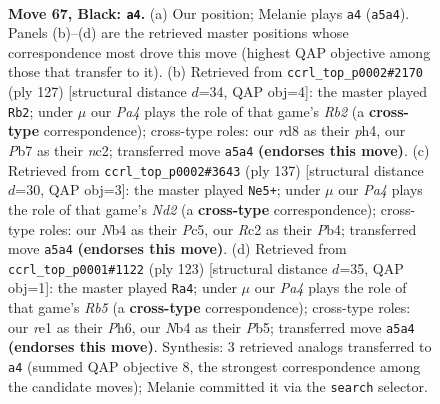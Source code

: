 \documentclass[11pt]{article}
\begin{document}
\clearpage

\begin{figure}[p]\centering
\begin{subfigure}{0.46\textwidth}\centering
\resizebox{\linewidth}{!}{%
\newchessgame
\chessboard[
  setfen={3R4/1p5p/1k4pP/p4p2/1n3P2/7K/2r5/4R3 b - - 22 67},
  showmover=false,
  pgfstyle=straightmove, color=movearrow, markmove={a5-a4}
]}
\caption{}
\end{subfigure}\hfill
\begin{subfigure}{0.46\textwidth}\centering
\resizebox{\linewidth}{!}{%
\newchessgame
\chessboard[
  setfen={3R4/1r2npk1/4p3/4Pp2/5P1P/8/2NB1K2/8 b - - 20 64},
  showmover=false,
  pgfstyle=straightmove, color=movearrow, markmove={b7-b2}
]}
\caption{}
\end{subfigure}
\\[4pt]
\begin{subfigure}{0.46\textwidth}\centering
\resizebox{\linewidth}{!}{%
\newchessgame
\chessboard[
  setfen={8/3nk3/3p2p1/2pP2P1/1p2P3/3K4/8/5R2 b - - 4 69},
  showmover=false,
  pgfstyle=straightmove, color=movearrow, markmove={d7-e5}
]}
\caption{}
\end{subfigure}\hfill
\begin{subfigure}{0.46\textwidth}\centering
\resizebox{\linewidth}{!}{%
\newchessgame
\chessboard[
  setfen={7k/6p1/p4p1p/Pp3P2/1r6/7P/3R1B2/6K1 b - - 0 62},
  showmover=false,
  pgfstyle=straightmove, color=movearrow, markmove={b4-a4}
]}
\caption{}
\end{subfigure}
\caption{\textbf{Move 67, Black: \texttt{a4}.} (a) Our position; Melanie plays \texttt{a4} (\texttt{a5a4}). Panels (b)--(d) are the retrieved master positions whose correspondence most drove this move (highest QAP objective among those that transfer to it). (b) Retrieved from \texttt{ccrl\_top\_p0002\#2170} (ply 127) [structural distance $d$=34, QAP obj=4]: the master played \texttt{Rb2}; under $\mu$ our \emph{Pa4} plays the role of that game's \emph{Rb2} (a \textbf{cross-type} correspondence); cross-type roles: our \emph{r}d8 as their \emph{p}h4, our \emph{P}b7 as their \emph{n}c2; transferred move \texttt{a5a4} \textbf{(endorses this move)}. (c) Retrieved from \texttt{ccrl\_top\_p0002\#3643} (ply 137) [structural distance $d$=30, QAP obj=3]: the master played \texttt{Ne5+}; under $\mu$ our \emph{Pa4} plays the role of that game's \emph{Nd2} (a \textbf{cross-type} correspondence); cross-type roles: our \emph{N}b4 as their \emph{P}c5, our \emph{R}c2 as their \emph{P}b4; transferred move \texttt{a5a4} \textbf{(endorses this move)}. (d) Retrieved from \texttt{ccrl\_top\_p0001\#1122} (ply 123) [structural distance $d$=35, QAP obj=1]: the master played \texttt{Ra4}; under $\mu$ our \emph{Pa4} plays the role of that game's \emph{Rb5} (a \textbf{cross-type} correspondence); cross-type roles: our \emph{r}e1 as their \emph{P}h6, our \emph{N}b4 as their \emph{P}b5; transferred move \texttt{a5a4} \textbf{(endorses this move)}. Synthesis: 3 retrieved analogs transferred to \texttt{a4} (summed QAP objective 8, the strongest correspondence among the candidate moves); Melanie committed it via the \texttt{search} selector.}
\label{fig:thought-m133}
\end{figure}
\end{document}
